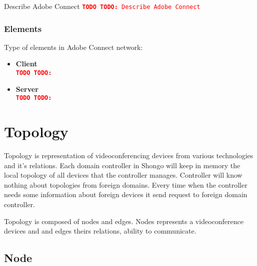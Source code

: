 \documentclass[a4paper]{report}
\newcommand{\TODO}[1]{%
\def\empty{}%
\def\prvniparametr{#1}%
\ifx\prvniparametr\empty%
\begingroup\tt\textcolor{red}{\noindent\textbf{TODO}}\endgroup
\else%
\begingroup\tt\textcolor{red}{\noindent\textbf{TODO:}\ #1}\endgroup
\fi%
}
\begin{document}
\TODO{Describe Adobe Connect}

\subsection{Elements}

Type of elements in Adobe Connect network:

\begin{itemize}
\item \textbf{Client} \\
\TODO{}
\item \textbf{Server} \\
\TODO{}
\end{itemize}


\chapter{Topology}

Topology is representation of videoconferencing devices from various technologies and it's relations. Each domain controller in Shongo will keep in memory the local topology of all devices that the controller manages.
Controller will know nothing about topologies from foreign domains. Every time when the controller needs some information about foreign devices it send request to foreign domain controller.

Topology is composed of nodes and edges. Nodes represents a videoconference devices and and edges theirs relations, ability to communicate.

\section{Node}
\end{document}

